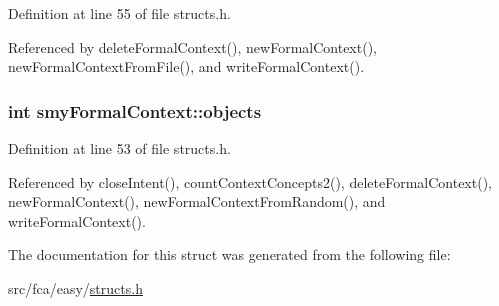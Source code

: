 \-Definition at line 55 of file structs.\-h.



\-Referenced by delete\-Formal\-Context(), new\-Formal\-Context(), new\-Formal\-Context\-From\-File(), and write\-Formal\-Context().

\hypertarget{structsmyFormalContext_ab6e220297887bc2af0e612c94132ceb3}{
\subsubsection[{objects}]{\setlength{\rightskip}{0pt plus 5cm}int {\bf smy\-Formal\-Context\-::objects}}}\label{structsmyFormalContext_ab6e220297887bc2af0e612c94132ceb3}


\-Definition at line 53 of file structs.\-h.



\-Referenced by close\-Intent(), count\-Context\-Concepts2(), delete\-Formal\-Context(), new\-Formal\-Context(), new\-Formal\-Context\-From\-Random(), and write\-Formal\-Context().



\-The documentation for this struct was generated from the following file\-:\begin{DoxyCompactItemize}
\item 
src/fca/easy/\hyperlink{easy_2structs_8h}{structs.\-h}\end{DoxyCompactItemize}
